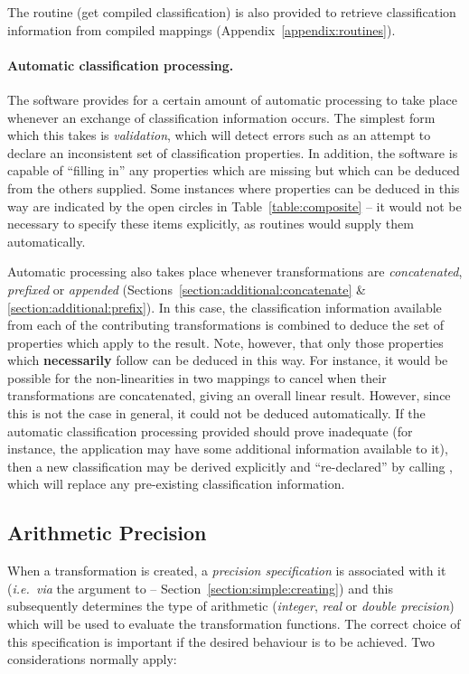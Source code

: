 The routine  (get compiled classification) is also provided
to retrieve classification information from compiled mappings
(Appendix~\ref{appendix:routines}). 

\paragraph{Automatic classification processing.}
The  software provides for a certain amount of automatic
processing to take place whenever an exchange of classification information
occurs. 
The simplest form which this takes is {\em validation}, which will detect
errors such as an attempt to declare an inconsistent set of classification
properties. 
In addition, the software is capable of ``filling in'' any properties which
are missing but which can be deduced from the others supplied. 
Some instances where properties can be deduced in this way are indicated by
the open circles in Table~\ref{table:composite} -- it would not be
necessary to specify these items explicitly, as  routines
would supply them automatically. 

Automatic processing also takes place whenever transformations are
{\em concatenated}, {\em prefixed} or {\em appended}
(Sections~\ref{section:additional:concatenate} \& 
\ref{section:additional:prefix}). 
In this case, the classification information available from each of the
contributing transformations is combined to deduce the set of
properties which apply to the result. 
Note, however, that only those properties which {\bf necessarily} follow can
be deduced in this way.
For instance, it would be possible for the non-linearities in two mappings
to cancel when their transformations are concatenated, giving an overall
linear result. 
However, since this is not the case in general, it could not be deduced
automatically. 
If the automatic classification processing provided should prove inadequate
(for instance, the application may have some additional information
available to it), then a new classification may be derived explicitly and
``re-declared'' by calling , which will replace any
pre-existing classification information. 


\subsection{Arithmetic Precision} 

\label{section:advanced:precision}

When a transformation is created, a {\em precision specification} is
associated with it ({\em i.e.\ via} the  argument to
 -- Section~\ref{section:simple:creating}) and this
subsequently determines the type of arithmetic ({\em integer}, {\em real} or
{\em double precision}) which will be used to evaluate the transformation
functions. 
The correct choice of this specification is important if the desired
behaviour is to be achieved.
Two considerations normally apply: 

